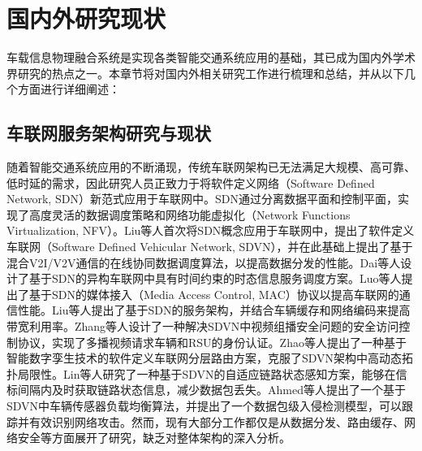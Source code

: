 \section{国内外研究现状}\label{section 1-3}

车载信息物理融合系统是实现各类智能交通系统应用的基础，其已成为国内外学术界研究的热点之一。本章节将对国内外相关研究工作进行梳理和总结，并从以下几个方面进行详细阐述：

\subsection{车联网服务架构研究与现状}

随着智能交通系统应用的不断涌现，传统车联网架构已无法满足大规模、高可靠、低时延的需求，因此研究人员正致力于将软件定义网络（Software Defined Network, SDN）新范式应用于车联网中。SDN通过分离数据平面和控制平面，实现了高度灵活的数据调度策略和网络功能虚拟化（Network Functions Virtualization, NFV）。Liu等人\cite{liu2016cooperative}首次将SDN概念应用于车联网中，提出了软件定义车联网（Software Defined Vehicular Network, SDVN），并在此基础上提出了基于混合V2I/V2V通信的在线协同数据调度算法，以提高数据分发的性能。Dai等人\cite{dai2018cooperative}设计了基于SDN的异构车联网中具有时间约束的时态信息服务调度方案。Luo等人\cite{luo2018sdnmac}提出了基于SDN的媒体接入（Media Access Control, MAC）协议以提高车联网的通信性能。Liu等人\cite{liu2018coding}提出了基于SDN的服务架构，并结合车辆缓存和网络编码来提高带宽利用率。Zhang等人\cite{zhang2022ac-sdvn}设计了一种解决SDVN中视频组播安全问题的安全访问控制协议，实现了多播视频请求车辆和RSU的身份认证。Zhao等人\cite{zhao2022elite}提出了一种基于智能数字孪生技术的软件定义车联网分层路由方案，克服了SDVN架构中高动态拓扑局限性。Lin等人\cite{lin2023alps}研究了一种基于SDVN的自适应链路状态感知方案，能够在信标间隔内及时获取链路状态信息，减少数据包丢失。Ahmed等人\cite{ahmed2023deep}提出了一个基于SDVN中车辆传感器负载均衡算法，并提出了一个数据包级入侵检测模型，可以跟踪并有效识别网络攻击。然而，现有大部分工作都仅是从数据分发、路由缓存、网络安全等方面展开了研究，缺乏对整体架构的深入分析。

